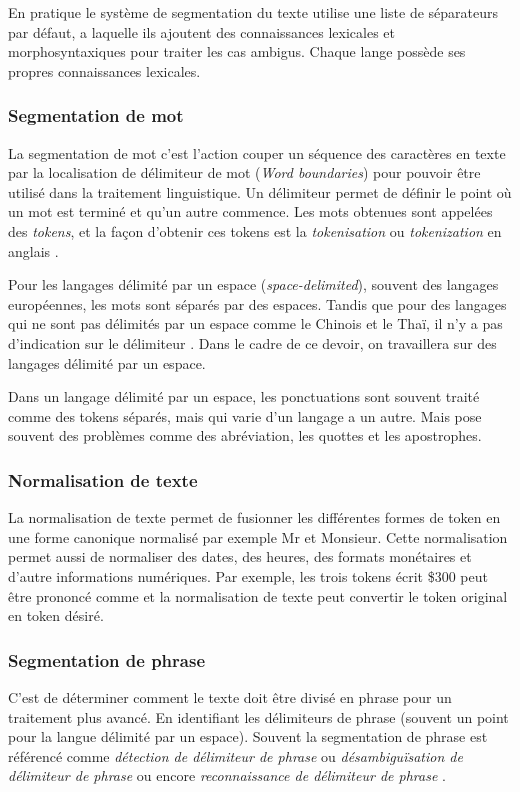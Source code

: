 En pratique le système de segmentation du texte utilise une liste de séparateurs par défaut, a laquelle ils ajoutent des connaissances lexicales et morphosyntaxiques pour traiter les cas ambigus. Chaque lange possède ses propres connaissances lexicales.

\subsubsection*{Segmentation de mot}
La segmentation de mot c'est l'action couper un séquence des caractères en texte par la localisation de délimiteur de mot (\emph{Word boundaries}) pour pouvoir être utilisé dans la traitement linguistique. Un délimiteur permet de définir le point où un mot est terminé et qu'un autre commence. Les mots obtenues sont appelées des \textit{tokens}, et la façon d'obtenir ces tokens est la \textit{tokenisation} ou \emph{tokenization} en anglais \citep{handbook-nlp}.

Pour les langages délimité par un espace (\emph{space-delimited}), souvent des langages européennes, les mots sont séparés par des espaces. Tandis que pour des langages qui ne sont pas délimités par un espace comme le Chinois et le Thaï, il n'y a pas d'indication sur le délimiteur \citep{handbook-nlp}. Dans le cadre de ce devoir, on travaillera sur des langages délimité par un espace.

Dans un langage délimité par un espace, les ponctuations sont souvent traité comme des tokens séparés, mais qui varie d'un langage a un autre. Mais pose souvent des problèmes comme des abréviation, les quottes et les apostrophes. \citep{handbook-nlp}

\subsubsection*{Normalisation de texte}
La normalisation de texte permet de fusionner les différentes formes de token en une forme canonique normalisé par exemple Mr et Monsieur. Cette normalisation permet aussi de normaliser des dates, des heures, des formats monétaires et d'autre informations numériques. Par exemple, les trois tokens écrit \$300 peut être prononcé comme  \fg{} et la normalisation de texte peut convertir le token original en token désiré. \citep{handbook-nlp}

\subsubsection*{Segmentation de phrase}
C'est de déterminer comment le texte doit être divisé en phrase pour un traitement plus avancé. En identifiant les délimiteurs de phrase (souvent un point pour la langue délimité par un espace). Souvent la segmentation de phrase est référencé comme \textit{détection de délimiteur de phrase} ou \textit{désambiguïsation de délimiteur de phrase} ou encore \textit{reconnaissance de délimiteur de phrase} \citep{handbook-nlp}.

